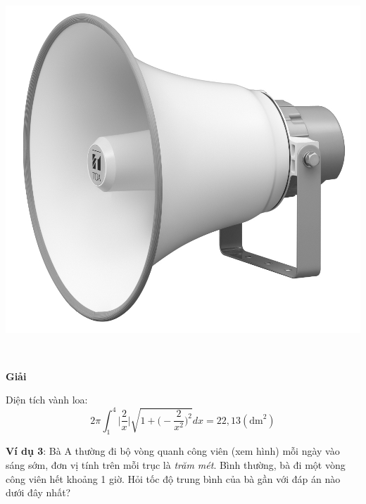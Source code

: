 \documentclass[13pt]{article}
\begin{document}
\begin{minipage}{7cm}
\end{minipage}
\begin{minipage}{7cm}
    \includegraphics[scale=0.5]{loa}
\end{minipage}\\
\centerline{\textbf{Giải}}
Diện tích vành loa: $$2\pi\int_1^4\bigg|\frac2x\bigg|\sqrt{1+\bigg(-\frac2{x^2}\bigg)^2}dx=22,13(\text{dm}^2)$$
\begin{minipage}{7cm}
\par\textbf{Ví dụ 3}: Bà A thường đi bộ vòng quanh công viên (xem hình) mỗi ngày vào sáng sớm, đơn vị tính trên mỗi trục là \textit{trăm mét}. Bình thường, bà đi một vòng công viên hết khoảng 1 giờ. Hỏi tốc độ trung bình của bà gần với đáp án nào dưới đây nhất?
\end{minipage}
\hspace{0.5cm}
\end{document}
